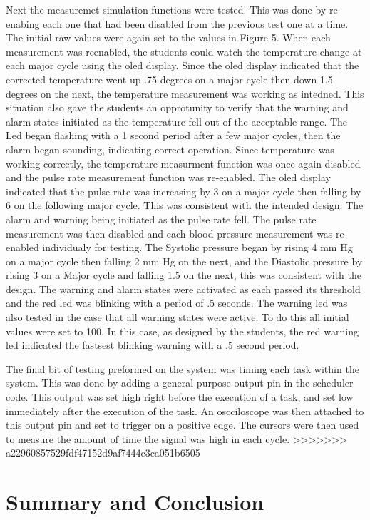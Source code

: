 \documentclass[12pt]{article} %
\begin{document}
Next the measuremet simulation functions were tested. This was done by re-enabing each one that had been disabled from the previous test one at a time. The initial raw values were again set to the values in Figure 5. When each measurement was reenabled, the students could watch the temperature change at each major cycle using the oled display. Since the oled display indicated that the corrected temperature went up .75 degrees on a major cycle then down 1.5 degrees on the next, the temperature measurement was working as intedned. This situation also gave the students an opprotunity to verify that the warning and alarm states initiated as the temperature fell out of the acceptable range. The Led began flashing with a 1 second period after a few major cycles, then the alarm began sounding, indicating correct operation. Since temperature was working correctly, the temperature measurment function was once again disabled and the pulse rate measurement function was re-enabled. The oled display indicated that the pulse rate was increasing by 3 on a major cycle then falling by 6 on the following major cycle. This was consistent with the intended design. The alarm and warning being initiated as the pulse rate fell. The pulse rate measurement was then disabled and each blood pressure measurement was re-enabled individualy for testing. The Systolic pressure began by rising 4 mm Hg on a major cycle then falling 2 mm Hg on the next, and the Diastolic pressure by rising 3 on a Major cycle and falling 1.5 on the next, this was consistent with the design. The warning and alarm states were activated as each passed its threshold and the red led was blinking with a period of .5 seconds. The warning led was also tested in the case that all warning states were active. To do this all initial values were set to 100. In this case, as designed by the students, the red warning led indicated the fastsest blinking warning with a .5 second period. 

The final bit of testing preformed on the system was timing each task within the system. This was done by adding a general purpose output pin in the scheduler code. This output was set high right before the execution of a task, and set low immediately after the execution of the task. An oscciloscope was then attached to this output pin and set to trigger on a positive edge. The cursors were then used to measure the amount of time the signal was high in each cycle.
>>>>>>> a22960857529fdf47152d9af7444c3ca051b6505

\section{Summary and Conclusion}
\end{document}

